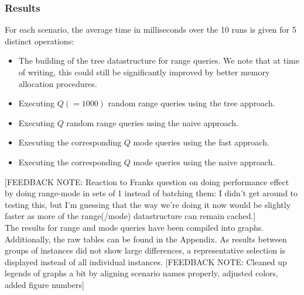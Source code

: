 \documentclass{article}
\newcommand{\fbnote}[1]{{\color{blue}[FEEDBACK NOTE: #1]\\}}
\begin{document}
\subsubsection*{Results}
For each scenario, the average time in milliseconds over the 10 runs is given for 5 distinct operations:
\begin{itemize}
    \item The building of the tree datastructure for range queries. We note that at time
          of writing, this could still be significantly improved by better memory
          allocation procedures.
    \item Executing $Q (= 1000)$ random range queries using the tree approach.
    \item Executing $Q$ random range queries using the naive approach.
    \item Executing the corresponding $Q$ mode queries using the fast approach.
    \item Executing the corresponding $Q$ mode queries using the naive approach.
\end{itemize}
\fbnote{Reaction to Franks question on doing performance effect by doing range-mode in sets of 1 instead of batching them: I didn't get around to testing this, but I'm guessing that the way we're doing it now would be slightly faster as more of the range(/mode) datastructure can remain cached.}
The results for range and mode queries have been compiled into graphs. Additionally, the raw tables can be found in the Appendix. As results between groups of instances did not show large differences, a representative selection is displayed instead of all individual instances. \fbnote{Cleaned up legends of graphs a bit by aligning scenario names properly, adjusted colors, added figure numbers} \\


\end{document}
